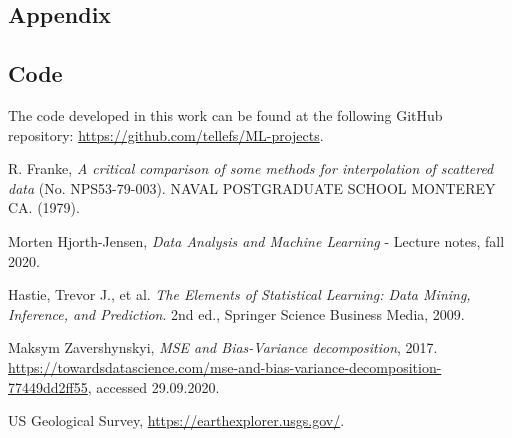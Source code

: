 \documentclass[norsk,a4paper,12pt]{article}
\begin{document}
\begin{multicols}{2}
\section{Appendix}
\subsection{Code}\label{sec:codeappendix}
The code developed in this work can be found at the following GitHub repository: \url{https://github.com/tellefs/ML-projects}.





\begin{thebibliography}{999}

R. Franke, \textit{A critical comparison of some methods for interpolation of scattered data} (No. NPS53-79-003). NAVAL POSTGRADUATE SCHOOL MONTEREY CA. (1979).

Morten Hjorth-Jensen, \textit{Data Analysis and Machine Learning} - Lecture notes, fall 2020.

Hastie, Trevor J., et al. \textit{The Elements of Statistical Learning: Data Mining, Inference, and Prediction}. 2nd ed., Springer Science Business Media, 2009.

Maksym Zavershynskyi, \textit{MSE and Bias-Variance decomposition}, 2017. \href{https://towardsdatascience.com/mse-and-bias-variance-decomposition-77449dd2ff55}{https://towardsdatascience.com/mse-and-bias-variance-decomposition-77449dd2ff55}, accessed 29.09.2020.


US Geological Survey, \href{https://earthexplorer.usgs.gov/}{https://earthexplorer.usgs.gov/}.


\end{thebibliography}

\end{multicols}
\end{document}
